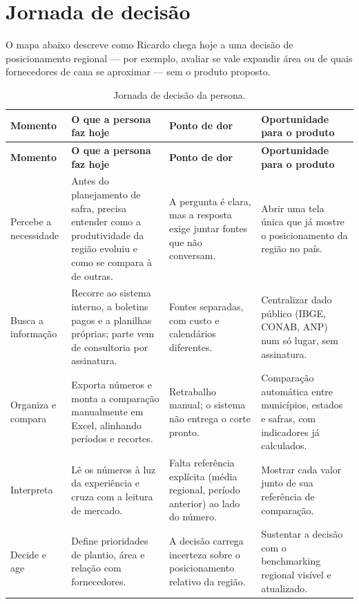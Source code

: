 \documentclass[11pt,a4paper]{article}
\begin{document}
\section{Jornada de decisão}

O mapa abaixo descreve como Ricardo chega hoje a uma decisão de posicionamento regional —
por exemplo, avaliar se vale expandir área ou de quais fornecedores de cana se aproximar —
sem o produto proposto.

\begin{longtable}{L{3.4cm} L{4.3cm} L{3.6cm} L{3.6cm}}
\caption{Jornada de decisão da persona.}\label{tab:jornada}\\
\toprule
\textbf{Momento} & \textbf{O que a persona faz hoje} & \textbf{Ponto de dor} & \textbf{Oportunidade para o produto}\\
\midrule
\endfirsthead
\toprule
\textbf{Momento} & \textbf{O que a persona faz hoje} & \textbf{Ponto de dor} & \textbf{Oportunidade para o produto}\\
\midrule
\endhead
\bottomrule
\endfoot
Percebe a necessidade &
Antes do planejamento de safra, precisa entender como a produtividade da região evoluiu e
como se compara à de outras. &
A pergunta é clara, mas a resposta exige juntar fontes que não conversam. &
Abrir uma tela única que já mostre o posicionamento da região no país.\\
\addlinespace
Busca a informação &
Recorre ao sistema interno, a boletins pagos e a planilhas próprias; parte vem de consultoria
por assinatura. &
Fontes separadas, com custo e calendários diferentes. &
Centralizar dado público (IBGE, CONAB, ANP) num só lugar, sem assinatura.\\
\addlinespace
Organiza e compara &
Exporta números e monta a comparação manualmente em Excel, alinhando períodos e recortes. &
Retrabalho manual; o sistema não entrega o corte pronto. &
Comparação automática entre municípios, estados e safras, com indicadores já calculados.\\
\addlinespace
Interpreta &
Lê os números à luz da experiência e cruza com a leitura de mercado. &
Falta referência explícita (média regional, período anterior) ao lado do número. &
Mostrar cada valor junto de sua referência de comparação.\\
\addlinespace
Decide e age &
Define prioridades de plantio, área e relação com fornecedores. &
A decisão carrega incerteza sobre o posicionamento relativo da região. &
Sustentar a decisão com o benchmarking regional visível e atualizado.\\
\end{longtable}
\end{document}
